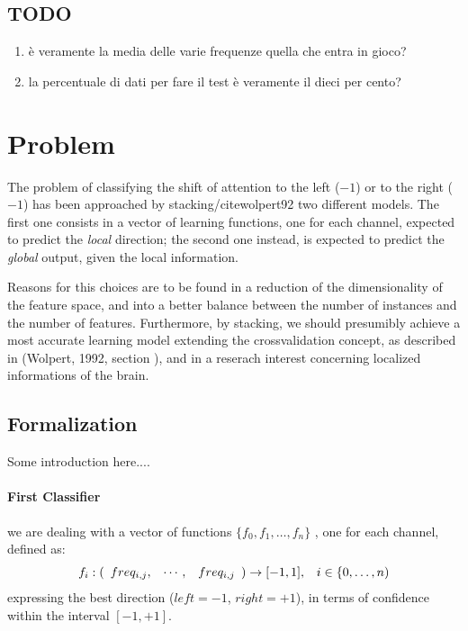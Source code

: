 \documentclass[10pt]{article}
\begin{document}
\subsection{TODO}
\begin{enumerate}
\item \`e veramente la media delle varie frequenze quella che entra in gioco? 
\item la percentuale di dati per fare il test \`e veramente il dieci per cento?
\end{enumerate}



\section{Problem}
The problem of classifying the shift of attention to
the left ($-1$) or to the right ($-1$) has been
approached by stacking/cite{wolpert92} two different
models. The first one consists in a vector of
learning functions, one for each channel, expected to
predict the \emph{local} direction; the second one
instead, is expected to predict the \emph{global}
output, given the local information.

Reasons for this choices are to be found in a reduction of the dimensionality of the feature space, and into a better balance between the number of instances and the number of features.
Furthermore, by stacking, we should presumibly
achieve a most accurate learning model extending the crossvalidation concept, as described in (Wolpert, 1992, section )\cite{wolpert92}, and in a reserach interest concerning localized informations of the brain.


\subsection{Formalization} 
Some introduction here....
\paragraph{First Classifier} we are dealing with a vector of functions
$ \{f_0, f_1, \dots, f_n \}$ 
, one for each channel, defined as:
$$
\begin{array}{lr}
f_i: (\begin{array}{l l l} freq_{i, j}, & \cdots, & freq_{i, j} \end{array}) \to [-1, 1],
&
i \in \{0, \dots, n)
\end{array}
$$ 
 expressing the best direction ($left=-1$, $right=+1$), in terms of confidence within the interval $[-1, +1]$.
\end{document}
